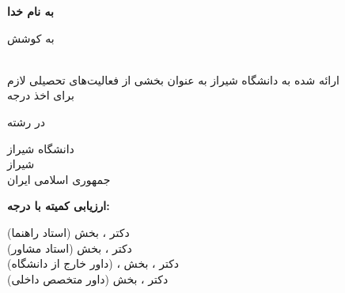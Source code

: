 \begin{center}
    \textbf{به نام خدا}
    \vspace{5mm}
    
    \textbf{\large \titleFA}
    \vspace{5mm}
    
    به کوشش \\
    \textbf{\authorFA}
    \vspace{5mm}
    
    {\typeFA} \\
    ارائه شده به دانشگاه شیراز به عنوان بخشی از فعالیت‌های تحصیلی لازم \\ برای اخذ درجه {\levelFA}
    \vspace{5mm}
    
   در رشته \\
   {\fieldFA}
    \vspace{5mm}

    دانشگاه شیراز \\
    شیراز \\
    جمهوری اسلامی ایران
\end{center}
\vspace{5mm}

\noindent
\textbf{ارزیابی کمیته {\typeFA} با درجه: {\gradeFA}}

\noindent
دکتر {\supervisorFA}، {\supervisorgradFA} ‌بخش {\supervisordeptFA} (استاد راهنما) \dotfill \\
دکتر {\advisorFA}، {\advisorgradFA} بخش {\advisordeptFA} (استاد مشاور)  \dotfill \\
دکتر {\extrefFA}، {\extrefgradFA} بخش  {\extrefdeptFA}، {\extrefuniFA}  (داور خارج از دانشگاه)  \dotfill \\
دکتر {}، {}  بخش {}  (داور متخصص داخلی)  \dotfill \\

\begin{center}
    {\dateFA}
\end{center}